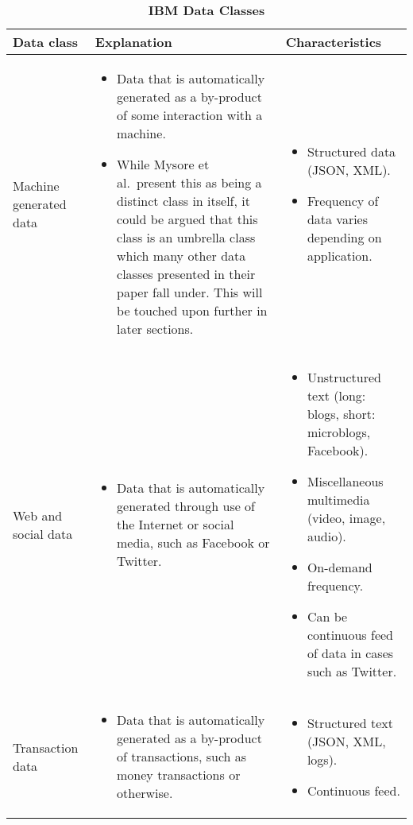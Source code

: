 \begin{landscape}

\begin{table}[H]
\footnotesize
\centering
\caption{\textbf{IBM Data Classes}}
\label{tab:ibm_data_tab}

\begin{tabular}{ | p{4cm} | p{10cm} | p{10cm} | }

\hline
\textbf{Data class}          &  \textbf{Explanation} & \textbf{Characteristics}   \\ \hline

Machine generated data
&
\begin{itemize}[leftmargin=*]
  \item Data that is automatically generated as a by-product of some interaction with a machine.
  \item While Mysore et al.\ present this as being a distinct class in itself, it could be argued that this class
  is an umbrella class which many other data classes presented in their paper fall under. This will be touched upon
  further in later sections.
\end{itemize}
&
\begin{itemize}[leftmargin=*]
  \item Structured data (JSON, XML).
  \item Frequency of data varies depending on application.
\end{itemize}
\\ \hline

Web and social data
&
\begin{itemize}[leftmargin=*]
  \item Data that is automatically generated through use of the Internet or social media, such as Facebook or Twitter.
\end{itemize}
&
\begin{itemize}[leftmargin=*]
  \item Unstructured text (long: blogs, short: microblogs, Facebook).
  \item Miscellaneous multimedia (video, image, audio).
  \item On-demand frequency.
  \item Can be continuous feed of data in cases such as Twitter.
\end{itemize}
\\ \hline

Transaction data
&
\begin{itemize}[leftmargin=*]
  \item Data that is automatically generated as a by-product of transactions, such as money transactions or otherwise.
\end{itemize}
&
\begin{itemize}[leftmargin=*]
  \item Structured text (JSON, XML, logs).
  \item Continuous feed.
\end{itemize}
\\ \hline


\end{tabular}
\end{table}
\end{landscape}
